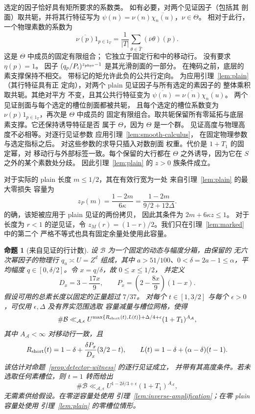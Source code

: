 \documentclass[11pt,a4paper]{article}
\numberwithin{equation}{section}
\numberwithin{figure}{section}
\newtheorem{proposition}[theorem]{命题}
\theoremstyle{definition}
\theoremstyle{remark}
\begin{document}
选定的因子恰好具有矩所要求的系数类。
如有必要，对两个见证因子（包括其
剖面）取共轭，并将其行特征写为
\(\psi(n)=\nu(n)\overline{\chi_n(u)}\)，\(\nu\in\Theta\)。
相对于此行，一个物理素数的系数为
\[
 \overline{\nu(p)}1_{p\in1_T}
 =\frac1{|T|}\sum_{\theta\in\widehat T}
       (\overline{\nu}\theta)(p).
\]
这是 \(\Theta\) 中成员的固定有限组合；
它独立于固定行和中的移动行。
没有要求 \(\eta(p)=1\)。
因子 \((q_p/P_i)^{z_{\rm phys}-1}\) 是其光滑剖面的一部分。
在掩码之前，底层的素支撑保持不相交。
带标记的矩允许此负的公共行定向。
为应用引理~\ref{lem:plain}（其行特征具有正
定向），对两个 plain 见证因子与所有选定的素因子的
整体乘积取共轭。其绝对平方
不变，且其公共行特征变为
\(\overline{\psi(n)}=\overline{\nu(n)}\chi_n(u)\)。
两个见证剖面与每个选定的槽位剖面都被共轭，
且每个选定的槽位系数变为
\(\nu(p)1_{p\in1_T}\)，再次是 \(\Theta\) 中成员的
固定有限组合。取共轭保留所有零延拓与底层
素支撑。它还保持诱导特征是否
属于 \(\Theta\)，因为 \(\Theta\) 是一个群。
见证高度与物理高度不必相等。对逐行见证参数
应用引理~\ref{lem:smooth-calculus}，
在固定物理参数与选定指标之后。
对这些参数的求导只插入对数剖面
权重。代价是 \(1+T_1\) 的固定幂，对
移动行与外部标签一致。每个保留的大行都在
\(\Theta\) 之外诱导，因为它在 \(S\) 之外的某个素数处分歧。
因此引理~\ref{lem:plain} 的 \(z>0\) 族条件成立。

对于实际的 plain 长度 \(m\le1/2\)，其在有效行宽为一处
来自引理~\ref{lem:plain} 的最大零损失
容量为
\begin{equation}
 z_P(m)=\frac{1-2m}{6\kappa}
       =\frac{1-2m}{9/2+12\Delta}.
 \label{eq:plain-zero-loss-capacity}
\end{equation}
的确，该矩被应用于 plain 见证的两份拷贝，
因此其条件为 \(2m+6\kappa z\le1\)。
对于长度为 \(r<1\) 的逆见证，令
\(z_M(r)=(1-r)/2\)。我们只在引理~\ref{lem:marked} 中的第二个
严格不等式也具有固定余量处使用此容量。

\begin{proposition}[来自见证的行计数]\label{prop:detector-counts}
设 \(\mathcal B\) 为一个固定的动态与幅度分箱，由保留的
无六次幂因子的物理行 \(q_u\asymp U=Z^d\) 组成，其中
\(a>51/100\)、\(0<\delta=2a-1\le\alpha\)，平均幅度
\(q\in[0,\delta/2]\)。令 \(x=q/\delta\)，故 \(0\le x\le1/2\)，
并定义
\[
 D_x=3-\frac{17x}{9},\qquad
 P_x=\left(2-\frac{8x}{9}\right)(1-x).
\]
假设可用的总素长度以固定的正量超过 \(7/37\)。
对每个 \(t\in[1,3/2]\) 与每个
\(\epsilon>0\)，可仅用 \(\epsilon,\Delta\) 及有界实范围选取
容量减量与槽位网格，使得
\[
 \#\mathcal B\ll_{\mathcal A,\epsilon}
 U^{\max\{R_{\rm short}(t),L(t)\}+\Delta/4+\epsilon}
 (1+T_1)^{A_{\mathcal A}},
\]
其中 \(A_{\mathcal A}<\infty\) 对移动行一致，且
\[
 R_{\rm short}(t)=1-\delta+\frac{\delta P_x}{D_x}(3/2-t),
 \qquad
 L(t)=1-\delta+(\alpha-\delta)(t-1).
\]
该估计对命题~\ref{prop:detector-witness} 的逐行见证成立，
并带有其高度条件。若未选取任何素槽位，则 \(t=1\) 转而给出
\[
 \#\mathcal B\ll_{\mathcal A,\epsilon}
 U^{1-2\delta/3+\epsilon}(1+T_1)^{A_{\mathcal A}},
\]
无需素供给假设。在零逆容量处使用
引理~\ref{lem:inverse-amplification}；在零 plain 容量处使用
引理~\ref{lem:plain} 的零槽位情形。
\end{proposition}
\end{document}
